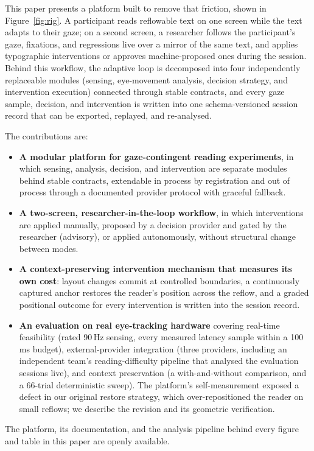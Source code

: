 This paper presents a platform built to remove that friction, shown in Figure~\ref{fig:rig}.
A participant reads reflowable text on one screen while the text adapts to their gaze; on a second screen, a researcher follows the participant's gaze, fixations, and regressions live over a mirror of the same text, and applies typographic interventions or approves machine-proposed ones during the session.
Behind this workflow, the adaptive loop is decomposed into four independently replaceable modules (sensing, eye-movement analysis, decision strategy, and intervention execution) connected through stable contracts, and every gaze sample, decision, and intervention is written into one schema-versioned session record that can be exported, replayed, and re-analysed.

The contributions are:
\begin{itemize}
  \item \textbf{A modular platform for gaze-contingent reading experiments}, in which sensing, analysis, decision, and intervention are separate modules behind stable contracts, extendable in process by registration and out of process through a documented provider protocol with graceful fallback.
  \item \textbf{A two-screen, researcher-in-the-loop workflow}, in which interventions are applied manually, proposed by a decision provider and gated by the researcher (advisory), or applied autonomously, without structural change between modes.
  \item \textbf{A context-preserving intervention mechanism that measures its own cost}: layout changes commit at controlled boundaries, a continuously captured anchor restores the reader's position across the reflow, and a graded positional outcome for every intervention is written into the session record.
  \item \textbf{An evaluation on real eye-tracking hardware} covering real-time feasibility (rated 90\,Hz sensing, every measured latency sample within a 100\,ms budget), external-provider integration (three providers, including an independent team's reading-difficulty pipeline that analysed the evaluation sessions live), and context preservation (a with-and-without comparison, and a 66-trial deterministic sweep).
    The platform's self-measurement exposed a defect in our original restore strategy, which over-repositioned the reader on small reflows; we describe the revision and its geometric verification.
\end{itemize}

The platform, its documentation, and the analysis pipeline behind every figure and table in this paper are openly available.
